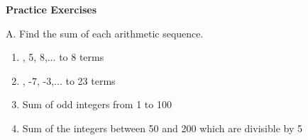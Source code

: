\textbf{Practice Exercises}

\vspce

A. Find the sum of each arithmetic sequence. 
\begin{enumerate}
\item {}, 5, 8,... to 8 terms
\item {}, -7, -3,... to 23 terms
\item \hspce Sum of odd integers from 1 to 100
\item \hspce Sum of the  integers between  50 and 200 which are divisible by 5
\end{enumerate}
